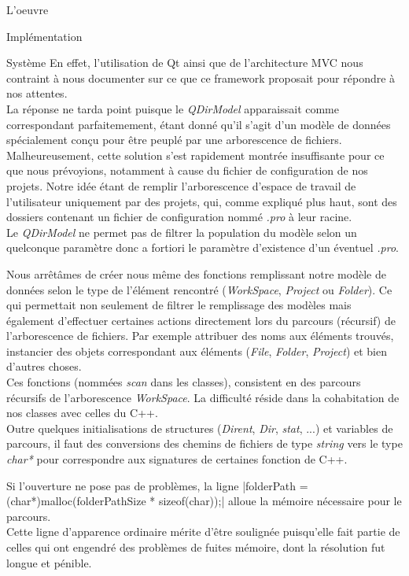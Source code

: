 \documentclass[a4paper, 12pt]{report}
\begin{document}
\begin{part}{L'oeuvre}
\begin{chapter}{Implémentation}
\begin{section}{Système}
				En effet, l'utilisation de \gls{Qt} ainsi que de l'architecture \gls{MVC} nous contraint à nous documenter sur ce que ce 
				framework proposait pour répondre à nos attentes.\\
				La réponse ne tarda point puisque le \emph{QDirModel} apparaissait comme correspondant parfaitemement, étant donné qu'il s'agit d'un
				modèle de données spécialement conçu pour être peuplé par une arborescence de fichiers.\\


				Malheureusement, cette solution s'est rapidement montrée insuffisante pour ce que nous prévoyions, notamment à cause du fichier de 
				configuration de nos projets. Notre idée étant de remplir l'arborescence d'espace de travail de l'utilisateur uniquement par des
				projets, qui, comme expliqué plus haut, sont des dossiers contenant un fichier de configuration nommé \emph{.pro} à leur racine.\\
				Le \emph{QDirModel} ne permet pas de filtrer la population du modèle selon un quelconque paramètre donc a fortiori le paramètre
				d'existence d'un éventuel \emph{.pro}.

				Nous arrêtâmes de créer nous même des fonctions remplissant notre modèle de données selon le type de l'élément rencontré
				(\emph{WorkSpace}, \emph{Project} ou \emph{Folder}). Ce qui permettait non seulement de filtrer le remplissage des modèles mais
				également d'effectuer certaines actions directement lors du parcours (récursif) de l'arborescence de fichiers.
				Par exemple attribuer des noms aux éléments trouvés, instancier des objets correspondant aux éléments (\emph{File}, \emph{Folder},
				\emph{Project}) et bien d'autres choses.\\


				Ces fonctions (nommées \emph{scan} dans les classes), consistent en des parcours récursifs de l'arborescence \emph{WorkSpace}.
				La difficulté réside dans la cohabitation de nos classes avec celles du \gls{C++}.\\
				Outre quelques initialisations de structures (\emph{Dirent}, \emph{Dir}, \emph{stat}, ...) et variables de parcours, il faut des
				conversions des chemins de fichiers de type \emph{string} vers le type \emph{char*} pour correspondre aux signatures de certaines
				fonction de \gls{C++}.


				Si l'ouverture ne pose pas de problèmes, la ligne |folderPath = (char*)malloc(folderPathSize * sizeof(char));|
				alloue la mémoire nécessaire pour le parcours.\\
				Cette ligne d'apparence ordinaire mérite d'être soulignée puisqu'elle fait partie de celles qui ont engendré des problèmes de fuites mémoire, dont la résolution fut longue et pénible.\\



\end{section}
\end{chapter}
\end{part}
\end{document}
